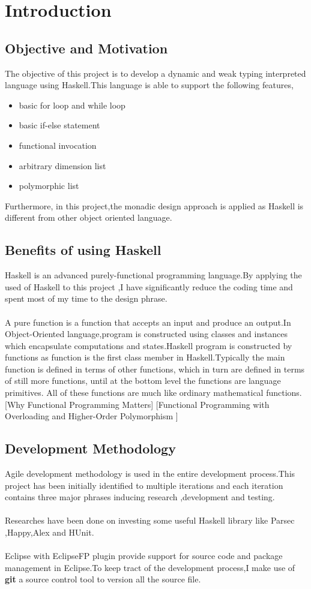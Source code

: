 \chapter{Introduction}
\section{Objective and Motivation}
The objective of this project is to develop a dynamic and weak typing interpreted language using Haskell.This language is able to support the following features,
\begin{itemize}
\item basic for loop and while loop
\item basic if-else statement
\item functional invocation 
\item arbitrary dimension list
\item polymorphic list
\end{itemize}

Furthermore, in this project,the monadic design approach is applied as Haskell is different from other object oriented language.

\section{Benefits of using Haskell} 
Haskell is an advanced purely-functional programming language.By applying the used of Haskell to this project ,I have significantly reduce the coding time and spent most of my time to the design phrase.
\\
\\
A pure function is a function that accepts an input and produce an output.In Object-Oriented language,program is constructed using classes and instances which encapsulate computations and states.Haskell program is constructed by functions as function is the first class member in Haskell.Typically the main function is defined in terms of other functions, which in turn are defined in terms of still more functions, until at the bottom level the functions are language primitives. All of these functions are much like ordinary mathematical functions.
[Why Functional Programming Matters]
[Functional Programming with Overloading and
Higher-Order Polymorphism
]
\section{Development Methodology}
Agile development methodology is used in the entire development process.This project has been initially identified to multiple iterations and each iteration contains three major phrases inducing research ,development and testing.
\\
\\
Researches have been done on investing some useful Haskell library like Parsec ,Happy,Alex and HUnit.
\\
\\
Eclipse with EclipseFP plugin provide support for source code and package management in Eclipse.To keep tract of the development process,I make use of \textbf{git} a source control tool to version all the source file.



